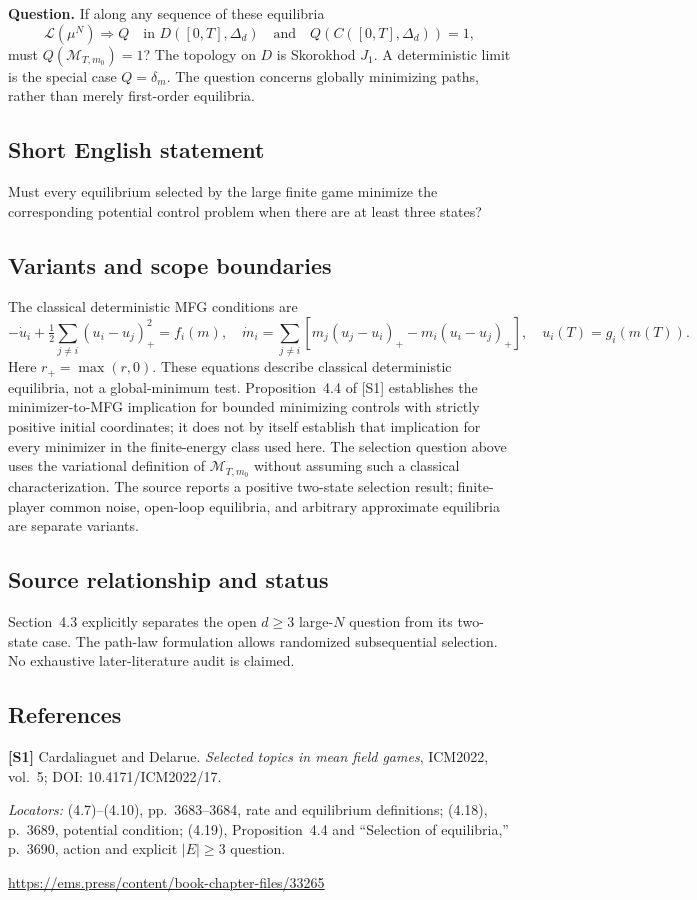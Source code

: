 \documentclass[11pt,a4paper]{article}
\begin{document}
\textbf{Question.} If along any sequence of these equilibria
\[
 \mathcal L(\mu^N)\Longrightarrow Q
 \quad\text{in }D([0,T],\Delta_d)
 \quad\text{and}\quad Q(C([0,T],\Delta_d))=1,
\]
must $Q(\mathcal M_{T,m_0})=1$? The topology on $D$ is Skorokhod $J_1$. A deterministic limit is the special case $Q=\delta_m$. The question concerns globally minimizing paths, rather than merely first-order equilibria.
\subsection*{Short English statement}
Must every equilibrium selected by the large finite game minimize the corresponding potential control problem when there are at least three states?
\subsection*{Variants and scope boundaries}
The classical deterministic MFG conditions are
\[
 -\dot u_i+\tfrac12\sum_{j\ne i}(u_i-u_j)_+^2=f_i(m),\quad
 \dot m_i=\sum_{j\ne i}[m_j(u_j-u_i)_+-m_i(u_i-u_j)_+],\quad
 u_i(T)=g_i(m(T)).
\]
Here $r_+=\max(r,0)$. These equations describe classical deterministic equilibria, not a global-minimum test. Proposition~4.4 of [S1] establishes the minimizer-to-MFG implication for bounded minimizing controls with strictly positive initial coordinates; it does not by itself establish that implication for every minimizer in the finite-energy class used here. The selection question above uses the variational definition of $\mathcal M_{T,m_0}$ without assuming such a classical characterization. The source reports a positive two-state selection result; finite-player common noise, open-loop equilibria, and arbitrary approximate equilibria are separate variants.
\subsection*{Source relationship and status}
Section~4.3 explicitly separates the open $d\geq3$ large-$N$ question from its two-state case. The path-law formulation allows randomized subsequential selection. No exhaustive later-literature audit is claimed.
\subsection*{References}
\begingroup\footnotesize\raggedright
{\footnotesize\raggedright
\textbf{[S1]} Cardaliaguet and Delarue. \emph{Selected topics in mean field games}, ICM2022, vol.~5; DOI: 10.4171/ICM2022/17.\par
\textit{Locators:} (4.7)--(4.10), pp.~3683--3684, rate and equilibrium definitions; (4.18), p.~3689, potential condition; (4.19), Proposition~4.4 and ``Selection of equilibria,'' p.~3690, action and explicit $|E|\geq3$ question.\par
\url{https://ems.press/content/book-chapter-files/33265}\par}
\par\endgroup
\end{document}
